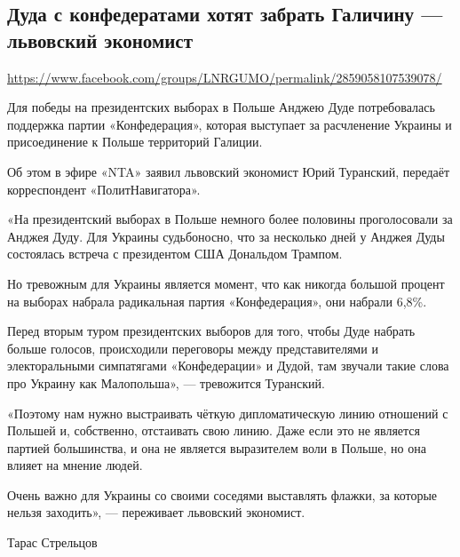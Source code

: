  
 
\subsection{Дуда с конфедератами хотят забрать Галичину --- львовский экономист}
\label{sec:19_07_2020.fb.lnr.6}
\url{https://www.facebook.com/groups/LNRGUMO/permalink/2859058107539078/}
  
Для победы на президентских выборах в Польше Анджею Дуде потребовалась
поддержка партии «Конфедерация», которая выступает за расчленение Украины и
присоединение к Польше территорий Галиции.

Об этом в эфире «NTA» заявил львовский экономист Юрий Туранский, передаёт
корреспондент «ПолитНавигатора».

«На президентский выборах в Польше немного более половины проголосовали за
Анджея Дуду. Для Украины судьбоносно, что за несколько дней у Анджея Дуды
состоялась встреча с президентом США Дональдом Трампом.

Но тревожным для Украины является момент, что как никогда большой процент на
выборах набрала радикальная партия «Конфедерация», они набрали 6,8\%.

Перед вторым туром президентских выборов для того, чтобы Дуде набрать больше
голосов, происходили переговоры между представителями и электоральными
симпатягами «Конфедерации» и Дудой, там звучали такие слова про Украину как
Малопольша», --- тревожится Туранский.

«Поэтому нам нужно выстраивать чёткую дипломатическую линию отношений с Польшей
и, собственно, отстаивать свою линию. Даже если это не является партией
большинства, и она не является выразителем воли в Польше, но она влияет на
мнение людей.

Очень важно для Украины со своими соседями выставлять флажки, за которые нельзя
заходить», --- переживает львовский экономист.

Тарас Стрельцов 
